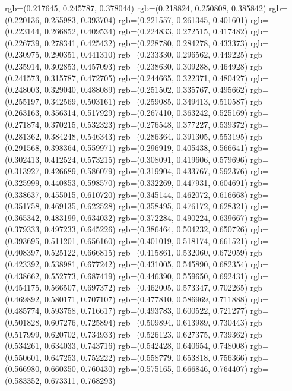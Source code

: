 {{{					rgb=(0.217645, 0.245787, 0.378044)
					rgb=(0.218824, 0.250808, 0.385842)
					rgb=(0.220136, 0.255983, 0.393704)
					rgb=(0.221557, 0.261345, 0.401601)
					rgb=(0.223144, 0.266852, 0.409534)
					rgb=(0.224833, 0.272515, 0.417482)
					rgb=(0.226739, 0.278341, 0.425432)
					rgb=(0.228780, 0.284278, 0.433373)
					rgb=(0.230975, 0.290351, 0.441310)
					rgb=(0.233330, 0.296562, 0.449225)
					rgb=(0.235914, 0.302853, 0.457093)
					rgb=(0.238630, 0.309288, 0.464928)
					rgb=(0.241573, 0.315787, 0.472705)
					rgb=(0.244665, 0.322371, 0.480427)
					rgb=(0.248003, 0.329040, 0.488089)
					rgb=(0.251502, 0.335767, 0.495662)
					rgb=(0.255197, 0.342569, 0.503161)
					rgb=(0.259085, 0.349413, 0.510587)
					rgb=(0.263163, 0.356314, 0.517929)
					rgb=(0.267410, 0.363242, 0.525169)
					rgb=(0.271874, 0.370215, 0.532323)
					rgb=(0.276548, 0.377227, 0.539372)
					rgb=(0.281362, 0.384248, 0.546343)
					rgb=(0.286364, 0.391305, 0.553195)
					rgb=(0.291568, 0.398364, 0.559971)
					rgb=(0.296919, 0.405438, 0.566641)
					rgb=(0.302413, 0.412524, 0.573215)
					rgb=(0.308091, 0.419606, 0.579696)
					rgb=(0.313927, 0.426689, 0.586079)
					rgb=(0.319904, 0.433767, 0.592376)
					rgb=(0.325999, 0.440853, 0.598570)
					rgb=(0.332269, 0.447931, 0.604691)
					rgb=(0.338637, 0.455015, 0.610720)
					rgb=(0.345144, 0.462072, 0.616668)
					rgb=(0.351758, 0.469135, 0.622528)
					rgb=(0.358495, 0.476172, 0.628321)
					rgb=(0.365342, 0.483199, 0.634032)
					rgb=(0.372284, 0.490224, 0.639667)
					rgb=(0.379333, 0.497233, 0.645226)
					rgb=(0.386464, 0.504232, 0.650726)
					rgb=(0.393695, 0.511201, 0.656160)
					rgb=(0.401019, 0.518174, 0.661521)
					rgb=(0.408397, 0.525122, 0.666815)
					rgb=(0.415861, 0.532060, 0.672059)
					rgb=(0.423392, 0.538981, 0.677242)
					rgb=(0.431005, 0.545890, 0.682354)
					rgb=(0.438662, 0.552773, 0.687419)
					rgb=(0.446390, 0.559650, 0.692431)
					rgb=(0.454175, 0.566507, 0.697372)
					rgb=(0.462005, 0.573347, 0.702265)
					rgb=(0.469892, 0.580171, 0.707107)
					rgb=(0.477810, 0.586969, 0.711888)
					rgb=(0.485774, 0.593758, 0.716617)
					rgb=(0.493783, 0.600522, 0.721277)
					rgb=(0.501828, 0.607276, 0.725894)
					rgb=(0.509894, 0.613989, 0.730443)
					rgb=(0.517999, 0.620702, 0.734933)
					rgb=(0.526123, 0.627375, 0.739362)
					rgb=(0.534261, 0.634033, 0.743716)
					rgb=(0.542428, 0.640654, 0.748008)
					rgb=(0.550601, 0.647253, 0.752222)
					rgb=(0.558779, 0.653818, 0.756366)
					rgb=(0.566980, 0.660350, 0.760430)
					rgb=(0.575165, 0.666846, 0.764407)
					rgb=(0.583352, 0.673311, 0.768293)
}}}
